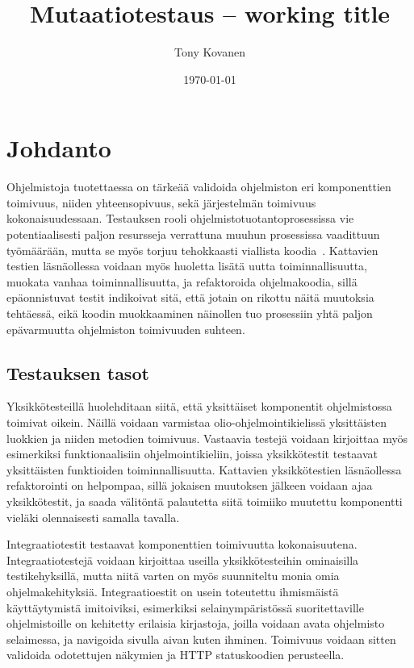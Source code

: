 \documentclass{tktltiki}
\begin{document}
\onehalfspacing

\title{Mutaatiotestaus -- working title}
\author{Tony Kovanen}
\date{\today}

\maketitle


\keywords{}

\mytableofcontents

\section{Johdanto}
Ohjelmistoja tuotettaessa on tärkeää validoida ohjelmiston eri komponenttien toimivuus, niiden yhteensopivuus, sekä järjestelmän toimivuus kokonaisuudessaan. Testauksen rooli ohjelmistotuotantoprosessissa vie potentiaalisesti paljon resursseja verrattuna muuhun prosessissa vaadittuun työmäärään, mutta se myös torjuu tehokkaasti viallista koodia~\cite{}. Kattavien testien läsnäollessa voidaan myös huoletta lisätä uutta toiminnallisuutta, muokata vanhaa toiminnallisuutta, ja refaktoroida ohjelmakoodia, sillä epäonnistuvat testit indikoivat sitä, että jotain on rikottu näitä muutoksia tehtäessä, eikä koodin muokkaaminen näinollen tuo prosessiin yhtä paljon epävarmuutta ohjelmiston toimivuuden suhteen.

\subsection{Testauksen tasot}
Yksikkötesteillä huolehditaan siitä, että yksittäiset komponentit ohjelmistossa toimivat oikein. Näillä voidaan varmistaa olio-ohjelmointikielissä yksittäisten luokkien ja niiden metodien toimivuus. Vastaavia testejä voidaan kirjoittaa myös esimerkiksi funktionaalisiin ohjelmointikieliin, joissa yksikkötestit testaavat yksittäisten funktioiden toiminnallisuutta. Kattavien yksikkötestien läsnäollessa refaktorointi on helpompaa, sillä jokaisen muutoksen jälkeen voidaan ajaa yksikkötestit, ja saada välitöntä palautetta siitä toimiiko muutettu komponentti vieläki olennaisesti samalla tavalla.

Integraatiotestit testaavat komponenttien toimivuutta kokonaisuutena. Integraatiotestejä voidaan kirjoittaa useilla yksikkötesteihin ominaisilla testikehyksillä, mutta niitä varten on myös suunniteltu monia omia ohjelmakehityksiä. Integraatioestit on usein toteutettu ihmismäistä käyttäytymistä imitoiviksi, esimerkiksi selainympäristössä suoritettaville ohjelmistoille on kehitetty erilaisia kirjastoja, joilla voidaan avata ohjelmisto selaimessa, ja navigoida sivulla aivan kuten ihminen. Toimivuus voidaan sitten validoida odotettujen näkymien ja HTTP statuskoodien perusteella.
\end{document}
